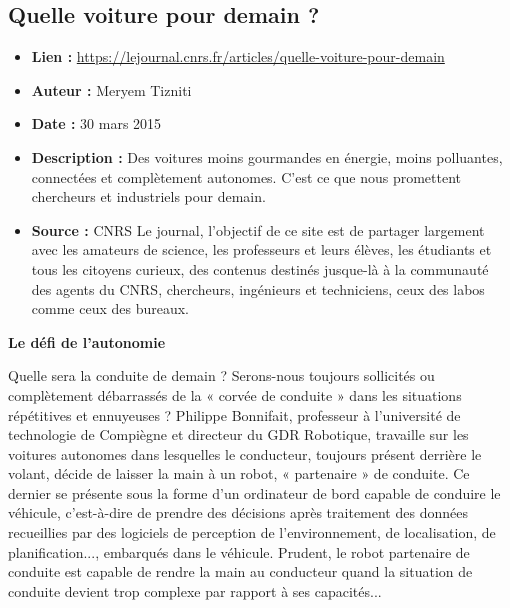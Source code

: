 \documentclass[8pt]{article}
\begin{document}
\subsection{Quelle voiture pour demain ?}
 
\begin{itemize}
	\item \textbf{Lien : }  \url{https://lejournal.cnrs.fr/articles/quelle-voiture-pour-demain} 
	\item \textbf{Auteur : } Meryem Tizniti
	\item \textbf{Date : } 30 mars 2015
	\item \textbf{Description : } Des voitures moins gourmandes en énergie, moins polluantes, connectées et complètement autonomes. C’est ce que nous promettent chercheurs et industriels pour demain.
	\item \textbf{Source : } CNRS Le journal, l'objectif de ce site est de partager largement avec les amateurs de science, les professeurs et leurs élèves, les étudiants et tous les citoyens curieux, des contenus destinés jusque-là à la communauté des agents du CNRS, chercheurs, ingénieurs et techniciens, ceux des labos comme ceux des bureaux.
\end{itemize}

\textbf{Le défi de l'autonomie}

Quelle sera la conduite de demain ? Serons-nous toujours sollicités ou complètement débarrassés de la « corvée de conduite » dans les situations répétitives et ennuyeuses ? Philippe Bonnifait, professeur à l’université de technologie de Compiègne et directeur du GDR Robotique, travaille sur les voitures autonomes dans lesquelles le conducteur, toujours présent derrière le volant, décide de laisser la main à un robot, « partenaire » de conduite. Ce dernier se présente sous la forme d’un ordinateur de bord capable de conduire le véhicule, c’est-à-dire de prendre des décisions après traitement des données recueillies par des logiciels de perception de l’environnement, de localisation, de planification..., embarqués dans le véhicule. Prudent, le robot partenaire de conduite est capable de rendre la main au conducteur quand la situation de conduite devient trop complexe par rapport à ses capacités...\\
\end{document}
